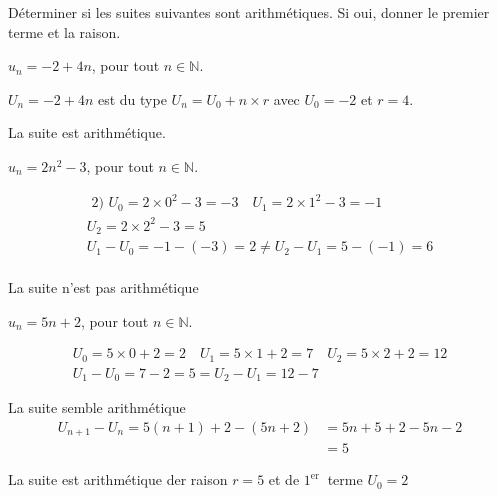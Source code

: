 \documentclass[12pt,a4paper]{article}  %
\begin{document}
Déterminer si les suites suivantes sont arithmétiques. Si oui, donner le premier terme et la raison.
	\begin{enumMet}
		\item $u_n=-2+4n$, pour tout $n \in \mathbb{N}$.
		\begin{corrBox}
			$U_n=-2+4 n$ est du type $U_n=U_0+n \times r$ avec $U_0=-2$ et $r=4$.
			
			La suite est arithmétique.
		\end{corrBox}
		\item $u_n=2n^2-3$, pour tout $n \in \mathbb{N}$.
		\begin{corrBox}
			$$
			\begin{array}{ll}
				\text { 2) } U_0=2 \times 0^2-3=-3 \quad U_1=2 \times 1^2-3=-1 \\
				U_2=2 \times 2^2-3=5 \\
				U_1-U_0=-1-(-3)=2 \neq U_2-U_1=5-(-1)=6 \\
			\end{array}
			$$
			
			La suite n'est pas arithmétique
		\end{corrBox}
		\item $u_n=5n+2$, pour tout $n \in \mathbb{N}$.
		\begin{corrBox}
			$$
			\begin{gathered}
				U_0=5 \times 0+2=2 \quad U_1=5 \times 1+2=7 \quad U_2=5 \times 2+2=12 \\
				U_1-U_0=7-2=5=U_2-U_1=12-7
			\end{gathered}
			$$
			
			La suite semble arithmétique
			$$
			\begin{aligned}
				U_{n+1}-U_n=5(n+1)+2-(5 n+2) & =5 n+5+2-5 n-2 \\
				& =5
			\end{aligned}
			$$
			
			La suite est arithmétique der raison $r=5$ et de $1^{\text {er }}$ terme $U_0=2$
			
		\end{corrBox}
	\end{enumMet}



%
\end{document}
